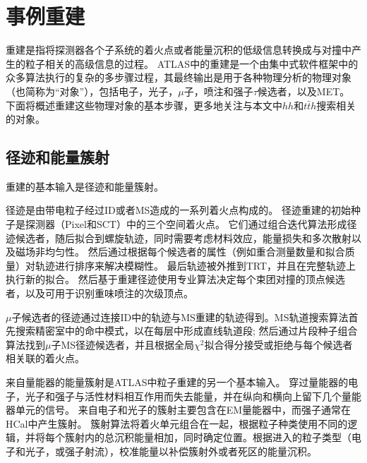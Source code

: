 \section{事例重建}\label{sec:evt_reco}
重建是指将探测器各个子系统的着火点或者能量沉积的低级信息转换成与对撞中产生的粒子相关的高级信息的过程。
ATLAS中的重建是一个由集中式软件框架中的众多算法执行的复杂的多步骤过程\cite{Calafiura:2005zz}，其最终输出是用于各种物理分析的物理对象（也简称为“对象”），包括电子，光子，$\mu$子，喷注和强子$\tau$候选者，以及MET。 下面将概述重建这些物理对象的基本步骤，更多地关注与本文中$hh$和$t\bar{t}h$搜索相关的对象。

\subsection{径迹和能量簇射}
重建的基本输入是径迹和能量簇射。

径迹是由带电粒子经过ID或者MS造成的一系列着火点构成的。
径迹重建\cite{Cornelissen:1020106}的初始种子是探测器（Pixel和SCT）中的三个空间着火点。
它们通过组合迭代算法形成径迹候选者，随后拟合到螺旋轨迹\cite{Cornelissen_2008}，同时需要考虑材料效应，能量损失和多次散射以及磁场非均匀性。
然后通过根据每个候选者的属性（例如重合测量数量和拟合质量）对轨迹进行排序来解决模糊性。 最后轨迹被外推到TRT，并且在完整轨迹上执行新的拟合。
然后基于重建径迹使用专业算法\cite{Piacquadio_2008}决定每个束团对撞的顶点候选者，以及可用于识别重味喷注的次级顶点。

$\mu$子候选者的径迹通过连接ID中的轨迹与MS重建的轨迹得到。MS轨道搜索算法\cite{Benekos_2008}首先搜索精密室中的命中模式，以在每层中形成直线轨道段;
然后通过片段种子组合算法找到$\mu$子MS径迹候选者，并且根据全局$\chi^{2}$拟合得分接受或拒绝与每个候选者相关联的着火点。

来自量能器的能量簇射是ATLAS中粒子重建的另一个基本输入。 
穿过量能器的电子，光子和强子与活性材料相互作用而失去能量，并在纵向和横向上留下几个量能器单元的信号。 来自电子和光子的簇射主要包含在EM量能器中，而强子通常在HCal中产生簇射。
簇射算法\cite{Lampl:1099735}将着火单元组合在一起，根据粒子种类使用不同的逻辑，并将每个簇射内的总沉积能量相加，同时确定位置。根据进入的粒子类型（电子和光子，或强子射流），校准能量以补偿簇射外或者死区的能量沉积。

